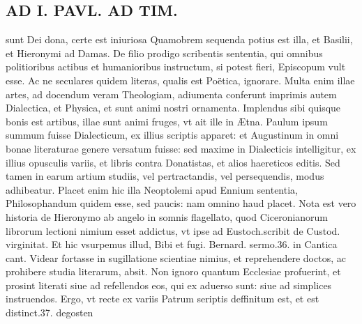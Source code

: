 \documentclass{article}
\begin{document}
\begin{pages}
\section*{AD I. PAVL. AD TIM. }
\marginpar{[ p.128 ]}\pstart sunt Dei dona, certe est iniuriosa Quamobrem sequenda potius est illa, et Basilii, et Hieronymi ad Damas. De filio prodigo scribentis sententia, qui omnibus politioribus actibus et humanioribus instructum, si potest fieri, Episcopum vult esse. Ac ne seculares quidem literas, qualis est Poëtica, ignorare. Multa enim illae artes, ad docendum veram Theologiam, adiumenta conferunt imprimis autem Dialectica, et Physica, et sunt animi nostri ornamenta. Implendus sibi quisque bonis est artibus, illae sunt animi fruges, vt ait ille in Ætna. Paulum ipsum summum fuisse Dialecticum, ex illius scriptis apparet: et Augustinum in omni bonae literaturae genere versatum fuisse: sed maxime in Dialecticis intelligitur, ex illius opusculis variis, et libris contra Donatistas, et alios haereticos editis. Sed tamen in earum artium studiis, vel pertractandis, vel persequendis, modus adhibeatur. Placet enim hic illa Neoptolemi apud Ennium sententia, Philosophandum quidem esse, sed paucis: nam omnino haud placet. Nota est vero historia de Hieronymo ab angelo in somnis flagellato, quod Ciceronianorum librorum lectioni nimium esset addictus, vt ipse ad Eustoch.scribit de Custod. virginitat. Et hic vsurpemus illud, Bibi et fugi. Bernard. sermo.36. in Cantica cant. Videar fortasse in sugillatione scientiae nimius, et reprehendere doctos, ac prohibere studia literarum, absit. Non ignoro quantum Ecclesiae profuerint, et prosint literati siue ad refellendos eos, qui ex aduerso sunt: siue ad simplices instruendos. Ergo, vt recte ex variis Patrum seriptis deffinitum est, et est distinct.37. degosten\pend

\end{pages}
\end{document}
